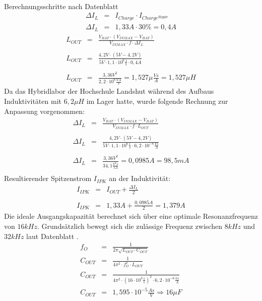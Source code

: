 \documentclass[12pt]{scrreprt} %
\begin{document}
\\
Berechnungsschritte nach Datenblatt \citep{BQ24100}
\begin{eqnarray}
\Delta I_L &=& I_{Charge} \cdot I_{Charge^{Ripple}}\\
\Delta I_L &=& 1,33 A \cdot 30 \% = 0,4A
\end{eqnarray}
\begin{eqnarray}
L_{OUT}&=&\frac{V_{BAT} \cdot \left( V_{INMAX} - V_{BAT} \right)}{V_{INMAX} \cdot f \cdot \Delta I_L}\\
\nonumber\\
L_{OUT}&=&\frac{4,2V \cdot \left(5V-4,2V\right)}{5V \cdot 1,1 \cdot 10^6 \frac{1}{s} \cdot 0,4A}\\
\nonumber\\
L_{OUT}&=&\frac{3,36 V^2}{2,2 \cdot 10^6  \frac{VA}{s}} = 1,527 \mu \frac{Vs}{A} = 1,527 \mu H
\end{eqnarray}
Da das Hybridlabor der Hochschule Landshut während des Aufbaus Induktivitäten mit $6,2\mu H$ im Lager hatte, wurde folgende Rechnung zur Anpassung vorgenommen:
\begin{eqnarray}
\Delta I_L&=&\frac{V_{BAT} \cdot \left( V_{INMAX} - V_{BAT} \right)}{V_{INMAX} \cdot f \cdot L_{OUT}}\\
\nonumber\\
\Delta I_L&=&\frac{4,2V \cdot \left(5V-4,2V\right)}{5V \cdot 1,1 \cdot 10^6 \frac{1}{s} \cdot 6,2 \cdot 10^{-6} \frac{Vs}{A}} \\
\nonumber\\
\Delta I_L& = & \frac{3,36 V^2}{34,1 \frac{V^2s}{sA}}=0,0985A = 98,5mA\\
\end{eqnarray}
Resultierender Spitzenstrom $I_{IPK}$ an der Induktivität:
\begin{eqnarray}
I_{IPK} &=& I_{OUT}+\frac{\Delta I_L}{2}\\
\nonumber\\
I_{IPK}&=& 1,33A + \frac{0,0985A}{2} = 1,379 A
\end{eqnarray}
Die ideale Ausgangskapazität berechnet sich über eine optimale Resonanzfrequenz von $16kHz$. Grundsätzlich bewegt sich die zulässige Frequenz zwischen $8kHz$ und $32kHz$ laut Datenblatt \citep{BQ24100}. 
\begin{eqnarray}
f_O&=&\frac{1}{2 \pi \sqrt{L_{OUT} \cdot C_{OUT}}}\\
C_{OUT}&=&\frac{1}{4 \pi^2 \cdot f_O^2 \cdot L_{OUT}}\\
C_{OUT}&=&\frac{1}{4 \pi^2 \cdot \left( 16 \cdot 10^3 \frac{1}{s} \right)^2 \cdot 6,2 \cdot 10^{-6} \frac{Vs}{A}}\\
C_{OUT}&=&1,595 \cdot 10^{-5} \frac{As}{V} \Rightarrow 16 \mu F
\end{eqnarray}
\end{document}
